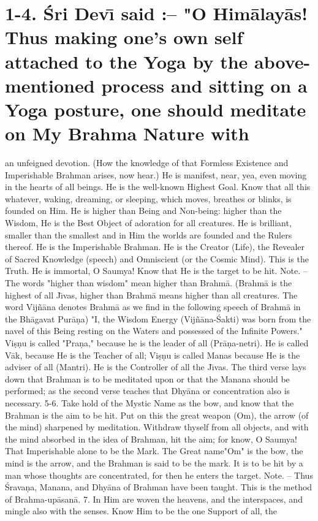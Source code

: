 \chapter{1-4. \'Sri Dev\={\i} said :-- "O Him\=alay\=as! Thus making one's own self attached to the Yoga by the above-mentioned process and sitting on a Yoga posture, one should meditate on My Brahma Nature with}

an unfeigned devotion. (How the knowledge of that Formless Existence and Imperishable Brahman arises, now hear.) He is manifest, near, yea, even moving in the hearts of all beings. He is the well-known Highest Goal. Know that all this whatever, waking, dreaming, or sleeping, which moves, breathes or blinks, is founded on Him. He is higher than Being and Non-being: higher than the Wisdom, He is the Best Object of adoration for all creatures. He is brilliant, smaller than the smallest and in Him the worlds are founded and the Rulers thereof. He is the Imperishable Brahman. He is the Creator (Life), the Revealer of Sacred Knowledge (speech) and Omniscient (or the Cosmic Mind). This is the Truth. He is immortal, O Saumya! Know that He is the target to be hit.
Note. -- The words "higher than wisdom" mean higher than Brahm\=a. (Brahm\=a is the highest of all J\={\i}vas, higher than Brahm\=a means higher than all creatures. The word Vij\~n\=ana denotes Brahm\=a as we find in the following speech of Brahm\=a in the Bh\=agavat Pur\=a\d{n}a) "I, the Wisdom Energy (Vij\~n\=ana-\'Sakti) was born from the navel of this Being resting on the Waters and possessed of the Infinite Powers."
Vi\d{s}\d{n}u is called "Pra\d{n}a," because he is the leader of all (Pr\=a\d{n}a-netri). He is called V\=ak, because He is the Teacher of all; Vi\d{s}\d{n}u is called Manas because He is the adviser of all (Mantri). He is the Controller of all the J\={\i}vas.
The third verse lays down that Brahman is to be meditated upon or that the Manana should be performed; as the second verse teaches that Dhy\=ana or concentration also is necessary.
5-6. Take hold of the Mystic Name as the bow, and know that the Brahman is the aim to be hit. Put on this the great weapon (Om), the arrow (of the mind) sharpened by meditation. Withdraw thyself from all objects, and with the mind absorbed in the idea of Brahman, hit the aim; for know, O Saumya! That Imperishable alone to be the Mark. The Great name"Om" is the bow, the mind is the arrow, and the Brahman is said to be the mark. It is to be hit by a man whose thoughts are concentrated, for then he enters the target.
Note. -- Thus \'Srava\d{n}a, Manana, and Dhy\=ana of Brahman have been taught. This is the method of Brahma-up\=asan\=a.
7. In Him are woven the heavens, and the interspaces, and mingle also with the senses. Know Him to be the one Support of all, the


